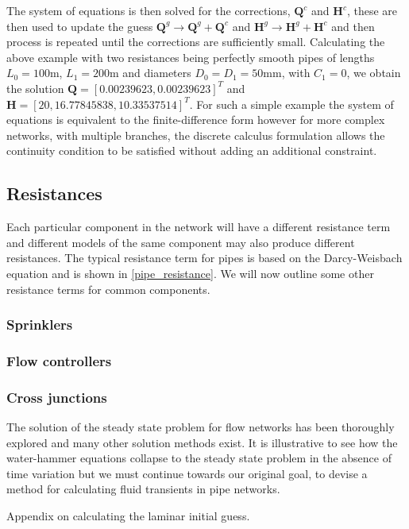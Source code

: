 The system of equations is then solved for the corrections, $\mathbf{Q}^c$ and $\mathbf{H}^c$, these are then used to update the guess $\mathbf{Q}^g \rightarrow \mathbf{Q}^g + \mathbf{Q}^c $ and $\mathbf{H}^g \rightarrow \mathbf{H}^g + \mathbf{H}^c $ and then process is repeated until the corrections are sufficiently small. Calculating the above example with two resistances being perfectly smooth pipes of lengths $L_0 = 100$m, $L_1 = 200$m and diameters $D_0=D_1=50$mm, with $C_1=0$, we obtain the solution $\mathbf{Q} = [0.00239623, 0.00239623]^T$ and $\mathbf{H} = [20, 16.77845838, 10.33537514]^T$. For such a simple example the system of equations is equivalent to the finite-difference form however for more complex networks, with multiple branches, the discrete calculus formulation allows the continuity condition to be satisfied without adding an additional constraint. 

\subsection{Resistances}

Each particular component in the network will have a different resistance term and different models of the same component may also produce different resistances. The typical resistance term for pipes is based on the Darcy-Weisbach equation and is shown in \eqref{pipe_resistance}. We will now outline some other resistance terms for common components. 







\subsubsection{Sprinklers}
\subsubsection{Flow controllers}

\subsubsection{Cross junctions}

The solution of the steady state problem for flow networks has been thoroughly explored and many other solution methods exist. It is illustrative to see how the water-hammer equations collapse to the steady state problem in the absence of time variation but we must continue towards our original goal, to devise a method for calculating fluid transients in pipe networks. 

{\color{red} Appendix on calculating the laminar initial guess.}
